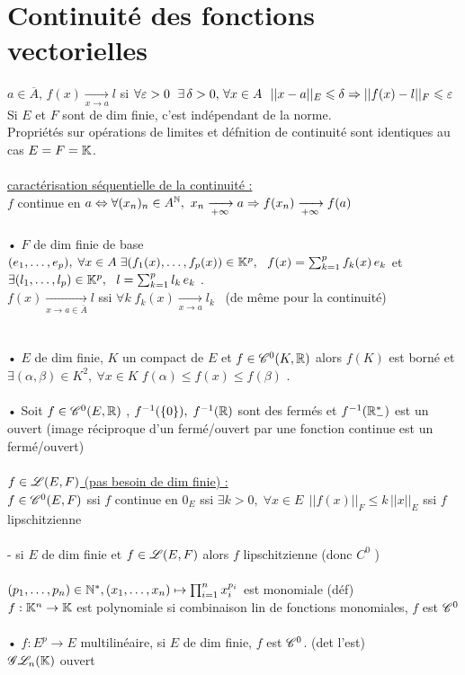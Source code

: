 \documentclass[12 pt]{exampleclass}
\begin{document}
\section{Continuité des fonctions vectorielles}
$a\in \overline{A}, \, f(x)\xrightarrow[x\to a]{} l$ si $\forall \varepsilon>0 \ \; \exists \, \delta>0 , \, \forall x\in A \ \ ||x-a||_E\leqslant \delta \Rightarrow ||f(x) - l||_F \leqslant \varepsilon$\\
Si $E$ et $F$ sont de dim finie, c'est indépendant de la norme.\\
Propriétés sur opérations de limites et défnition de continuité sont identiques au cas $E=F=\mathbb{K}$.\\
\text{}\\
\underline{caractérisation séquentielle de la continuité :}\\
$f$ continue en $a \Da \forall(x_n)_n\in A^\N , \ x_n\TI a \Ra f(x_n)\TI f(a)$\\
\text{}\\
• $F$ de dim finie de base $(e_1,\dots,e_p), \; \forall x\in A \; \exists(f_1(x),\dots,f_p(x))\in\mathbb{K}^p, \ \ f(x) = \sum_{k=1}^p f_k(x) \, e_k$ et $\exists (l_1,\dots,l_p)\in\mathbb{K}^p, \ \ l = \sum_{k=1}^p l_k \, e_k $ .\\
$f(x) \xrightarrow[x\to a\in\overline{A}]{} l$ ssi $\forall k \; f_k(x) \xrightarrow[x\to a]{} l_k$ \ (de même pour la continuité)\\
\text{}\\
\text{}\\
• $E$ de dim finie, $K$ un compact de $E$ et $f\in\mathscr{C}^0(K,\mathbb{R})$ alors $f(K)$ est borné et $\exists (\alpha,\beta)\in K^2, \ \forall x\in K \; f(\alpha)\leqslant f(x) \leqslant f(\beta)$ .\\
\text{}\\
• Soit $f\in \mathscr{C}^0(E,\mathbb{R})$ , $f^{-1}(\{0\}), \; f^{-1}(\mathbb{R})$ sont des fermés et $f^{-1}(\mathbb{R}_-^*)$ est un ouvert (image réciproque d'un fermé/ouvert par une fonction continue est un fermé/ouvert)\\

\text{}\\
\underline{$f\in\mathscr{L}(E,F)$ (pas besoin de dim finie) :}\\
$f\in \mathscr{C}^0(E,F)$ ssi $f$ continue en $0_E$ ssi $\exists k>0, \; \forall x\in E \ \ ||f(x)||_F \leqslant k \, ||x||_E$ ssi $f$ lipschitzienne\\
\text{}\\
- si $E$ de dim finie et $f\in\mathscr{L}(E,F)$ alors $f$ lipschitzienne (donc $C^0$ )\\
\text{}\\
$(p_1,\dots,p_n)\in\mathbb{N}^*, (x_1,\dots,x_n) \mapsto \prod_{i=1}^n x_i^{p_i}$ est monomiale (déf)\\
$f : \mathbb{K}^n \to \mathbb{K}$ est polynomiale si combinaison lin de fonctions monomiales, $f$ est $\mathscr{C}^0$\\
\text{}\\
• $f:E^p\to E$ multilinéaire, si $E$ de dim finie, $f$ est $\mathscr{C}^0$. (det l'est)\\
$\mathscr{G}\mathscr{L}_n(\mathbb{K})$ ouvert\\
\end{document}
